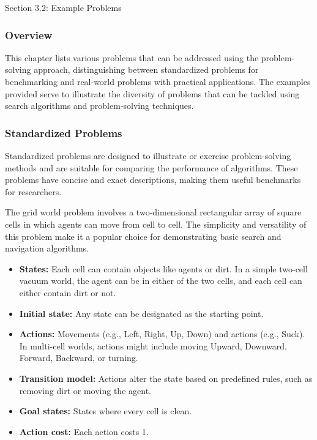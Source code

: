 \begin{notes}{Section 3.2: Example Problems}
    \subsubsection*{Overview}

    This chapter lists various problems that can be addressed using the problem-solving approach, distinguishing between standardized problems for benchmarking and real-world problems with practical 
    applications. The examples provided serve to illustrate the diversity of problems that can be tackled using search algorithms and problem-solving techniques.

    \subsubsection*{Standardized Problems}

    Standardized problems are designed to illustrate or exercise problem-solving methods and are suitable for comparing the performance of algorithms. These problems have concise and exact descriptions, 
    making them useful benchmarks for researchers.

    \begin{highlight}
        The grid world problem involves a two-dimensional rectangular array of square cells in which agents can move from cell to cell. The simplicity and versatility of this problem make it a popular 
        choice for demonstrating basic search and navigation algorithms.
    
        \begin{itemize}
            \item \textbf{States:} Each cell can contain objects like agents or dirt. In a simple two-cell vacuum world, the agent can be in either of the two cells, and each cell can either contain dirt or not.
            \item \textbf{Initial state:} Any state can be designated as the starting point.
            \item \textbf{Actions:} Movements (e.g., Left, Right, Up, Down) and actions (e.g., Suck). In multi-cell worlds, actions might include moving Upward, Downward, Forward, Backward, or turning.
            \item \textbf{Transition model:} Actions alter the state based on predefined rules, such as removing dirt or moving the agent.
            \item \textbf{Goal states:} States where every cell is clean.
            \item \textbf{Action cost:} Each action costs 1.
        \end{itemize}
    \end{highlight}


\end{notes}
